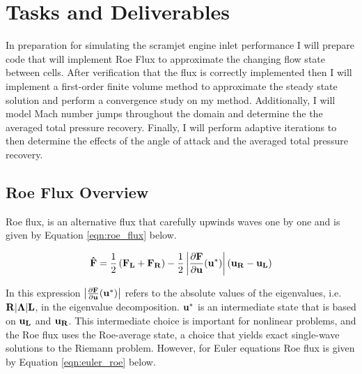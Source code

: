 \pagebreak
\section{Tasks and Deliverables}
In preparation for simulating the scramjet engine inlet performance I will prepare code that will implement Roe Flux to approximate the changing flow state between cells. After verification that the flux is correctly implemented then I will implement a first-order finite volume method to approximate the steady state solution and perform a convergence study on my method. Additionally, I will model Mach number jumps throughout the domain and determine the the averaged total pressure recovery. Finally, I will perform adaptive iterations to then determine the effects of the angle of attack and the averaged total pressure recovery.

\subsection{Roe Flux Overview}

Roe flux, is an alternative flux that carefully upwinds waves one by one and is given by Equation \ref{eqn:roe_flux} below. \cite{notes:kfid}

\vspace{-0.45in}
\begin{equation}\label{eqn:roe_flux}
    {\bf \hat{F}} = \frac{1}{2}\left({\bf F_L + F_R}\right) - \frac{1}{2} \left\lvert \frac{\partial {\bf F}}{\partial {\bf u}}({\bf u}^*)\right\lvert({\bf u_R - u_L})
\end{equation}

\vspace{-0.25in}
In this expression $\left\lvert \frac{\partial {\bf F}}{\partial {\bf u}}({\bf u}^*)\right\lvert$ refers to the absolute values of the eigenvalues, i.e. $\bf R|\Lambda | L$, in the eigenvalue decomposition. $\bf u^*$ is an intermediate state that is based on $\bf u_L$ and $\bf u_R$. This intermediate choice is important for nonlinear problems, and the Roe flux uses the Roe-average state, a choice that yields exact single-wave solutions to the Riemann problem. However, for Euler equations Roe flux is given by Equation \ref{eqn:euler_roe} below.

